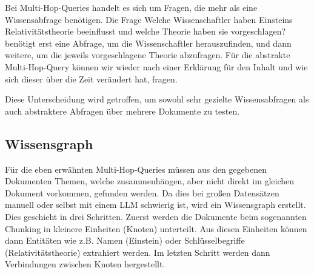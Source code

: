 Bei Multi-Hop-Queries handelt es sich um Fragen, die mehr als eine Wissensabfrage benötigen. Die Frage \glqq Welche Wissenschaftler haben Einsteins Relativitätstheorie beeinflusst und welche Theorie haben sie vorgeschlagen?\grqq{} benötigt erst eine Abfrage, um die Wissenschaftler herauszufinden, und dann weitere, um die jeweils vorgeschlagene Theorie abzufragen.
Für die abstrakte Multi-Hop-Query können wir wieder nach einer Erklärung für den Inhalt und wie sich dieser über die Zeit verändert hat, fragen.

Diese Unterscheidung wird getroffen, um sowohl sehr gezielte Wissensabfragen als auch abstraktere Abfragen über mehrere Dokumente zu testen.

\subsection{Wissensgraph}

Für die eben erwähnten Multi-Hop-Queries müssen aus den gegebenen Dokumenten Themen, welche zusammenhängen, aber nicht direkt im gleichen Dokument vorkommen, gefunden werden.
Da dies bei großen Datensätzen manuell oder selbst mit einem LLM schwierig ist, wird ein Wissensgraph erstellt. \\
Dies geschieht in drei Schritten. Zuerst werden die Dokumente beim sogenannten Chunking in kleinere Einheiten (Knoten) unterteilt.
Aus diesen Einheiten können dann Entitäten wie z.B. Namen (Einstein) oder Schlüsselbegriffe (Relativitätstheorie) extrahiert werden.
Im letzten Schritt werden dann Verbindungen zwischen Knoten hergestellt.


